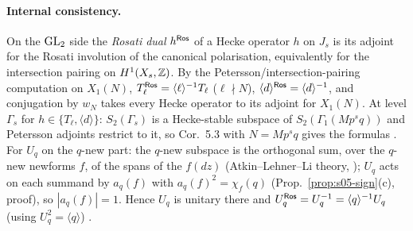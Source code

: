 \paragraph{Internal consistency.}
On the $\mathrm{GL}_2$ side the \emph{Rosati dual} $h^{\mathsf{Ros}}$ of a Hecke operator $h$ on $J_s$ is its adjoint for the Rosati involution of the
canonical polarisation, equivalently for the intersection pairing on $H^1(X_s,\mathbb{Z})$. By the Petersson/intersection-pairing computation
on $X_1(N)$, $T_\ell^{\mathsf{Ros}}=\langle\ell\rangle^{-1}T_\ell$ ($\ell\nmid N$), $\langle d\rangle^{\mathsf{Ros}}=\langle d\rangle^{-1}$, and conjugation by $w_N$ takes
every Hecke operator to its adjoint  \stcited{} for $X_1(N)$. At level $\Gamma_s$ for $h\in\{T_\ell,\langle d\rangle\}$: $S_2(\Gamma_s)$ is a
Hecke-stable subspace of $S_2(\Gamma_1(Mp^sq))$ and Petersson adjoints restrict to it, so Cor.~5.3 with $N=Mp^sq$ gives the formulas \stpmc. For $U_q$ on the $q$-new part: the $q$-new subspace is the orthogonal
sum, over the $q$-new newforms $f$, of the spans of the $f(dz)$ (Atkin--Lehner--Li theory, \stknown); $U_q$ acts on each summand by
$a_q(f)$ with $a_q(f)^2=\chi_f(q)$ (Prop.~\ref{prop:s05-sign}(c), proof), so $|a_q(f)|=1$. Hence $U_q$ is unitary there and
$U_q^{\mathsf{Ros}}=U_q^{-1}=\langle q\rangle^{-1}U_q$ (using $U_q^2=\langle q\rangle$) \stpmc.

